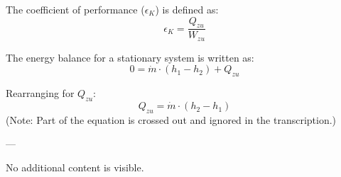 The coefficient of performance (\( \epsilon_K \)) is defined as:  
\[
\epsilon_K = \frac{Q_{zu}}{W_{zu}}
\]

The energy balance for a stationary system is written as:  
\[
0 = \dot{m} \cdot (h_1 - h_2) + Q_{zu}
\]

Rearranging for \( Q_{zu} \):  
\[
Q_{zu} = \dot{m} \cdot (h_2 - h_1)
\]  
(Note: Part of the equation is crossed out and ignored in the transcription.)

---

No additional content is visible.